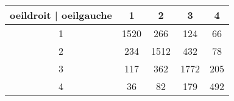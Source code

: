 \begin{enumerate}
\begin{center}
\begin{tabular}{|c||c|c|c|c|}
\hline
oeildroit | oeilgauche &	1 & 	2	&	3 	& 	4 	\\
\hline
1			&  1520 	  &	266	& 124 		&	66	\\
\hline
2			&  234 	  & 	1512 	& 432		& 	78	\\
\hline
3			& 117 	&  362		& 	1772	& 	205	\\
\hline
4			& 36 	& 82 & 179 & 492 \\
\hline
\end{tabular}
\end{center}
\end{enumerate}
